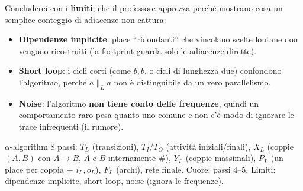 Concluderei con i \textbf{limiti}, che il professore apprezza perché mostrano cosa un semplice conteggio di adiacenze non cattura:
\begin{itemize}
  \item \textbf{Dipendenze implicite}: place ``ridondanti'' che vincolano scelte lontane non vengono ricostruiti (la footprint guarda solo le adiacenze dirette).
  \item \textbf{Short loop}: i cicli corti (come $b,b$, o cicli di lunghezza due) confondono l'algoritmo, perché $a \parallel_L a$ non è distinguibile da un vero parallelismo.
  \item \textbf{Noise}: l'algoritmo \textbf{non tiene conto delle frequenze}, quindi un comportamento raro pesa quanto uno comune e non c'è modo di ignorare le trace infrequenti (il rumore).
\end{itemize}

\begin{puntochiave}{$\alpha$-algorithm}
8 passi: $T_L$ (transizioni), $T_I$/$T_O$ (attività iniziali/finali), $X_L$ (coppie $(A,B)$ con $A\to B$, $A$ e $B$ internamente $\#$), $Y_L$ (coppie massimali), $P_L$ (un place per coppia + $i_L,o_L$), $F_L$ (archi), rete finale. Cuore: passi 4--5. Limiti: dipendenze implicite, short loop, noise (ignora le frequenze).
\end{puntochiave}
